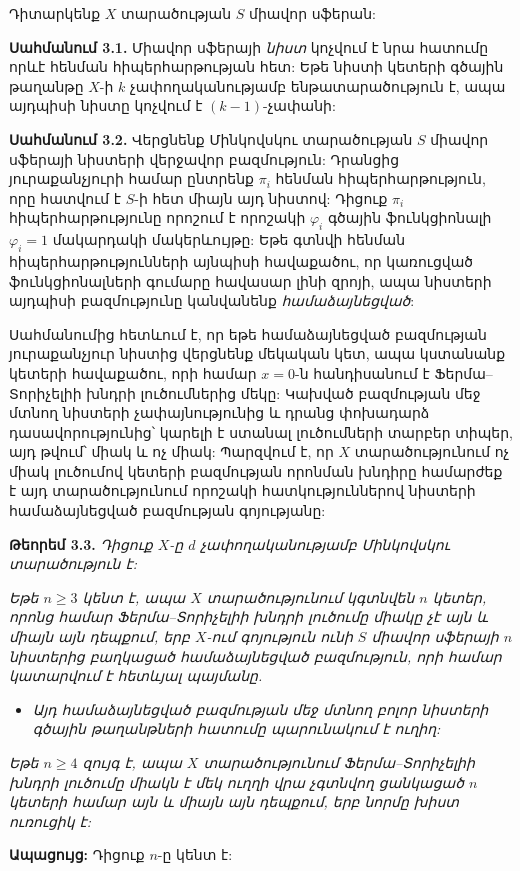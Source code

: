 \documentclass[12pt,a4paper]{article}
\numberwithin{equation}{section}
\numberwithin{figure}{section}
\begin{document}
Դիտարկենք $X$ տարածության $S$ միավոր սֆերան:

\textbf{Սահմանում 3.1.} Միավոր սֆերայի \textit{նիստ} կոչվում է նրա հատումը որևէ հենման հիպերհարթության հետ: Եթե նիստի կետերի գծային թաղանթը $X$-ի $k$ չափողականությամբ ենթատարածություն է, ապա այդպիսի նիստը կոչվում է $(k-1)$-չափանի:

\textbf{Սահմանում 3.2.} Վերցնենք Մինկովսկու տարածության $S$ միավոր սֆերայի նիստերի վերջավոր բազմություն: Դրանցից յուրաքանչյուրի համար ընտրենք $\pi_i$ հենման հիպերհարթություն, որը հատվում է $S$-ի հետ միայն այդ նիստով: Դիցուք $\pi_i$ հիպերհարթությունը որոշում է որոշակի $\varphi_i$ գծային ֆունկցիոնալի $\varphi_i = 1$ մակարդակի մակերևույթը: Եթե գտնվի հենման հիպերհարթությունների այնպիսի հավաքածու, որ կառուցված ֆունկցիոնալների գումարը հավասար լինի զրոյի, ապա նիստերի այդպիսի բազմությունը կանվանենք \textit{համաձայնեցված}:

Սահմանումից հետևում է, որ եթե համաձայնեցված բազմության յուրաքանչյուր նիստից վերցնենք մեկական կետ, ապա կստանանք կետերի հավաքածու, որի համար $x = 0$-ն հանդիսանում է Ֆերմա--Տորիչելիի խնդրի լուծումներից մեկը: Կախված բազմության մեջ մտնող նիստերի չափայնությունից և դրանց փոխադարձ դասավորությունից՝ կարելի է ստանալ լուծումների տարբեր տիպեր, այդ թվում՝ միակ և ոչ միակ: Պարզվում է, որ $X$ տարածությունում ոչ միակ լուծումով կետերի բազմության որոնման խնդիրը համարժեք է այդ տարածությունում որոշակի հատկություններով նիստերի համաձայնեցված բազմության գոյությանը:

\textbf{Թեորեմ 3.3.} \textit{Դիցուք $X$-ը $d$ չափողականությամբ Մինկովսկու տարածություն է:}

\textit{Եթե $n \ge 3$ կենտ է, ապա $X$ տարածությունում կգտնվեն $n$ կետեր, որոնց համար Ֆերմա--Տորիչելիի խնդրի լուծումը միակը չէ այն և միայն այն դեպքում, երբ $X$-ում գոյություն ունի $S$ միավոր սֆերայի $n$ նիստերից բաղկացած համաձայնեցված բազմություն, որի համար կատարվում է հետևյալ պայմանը.}
\begin{itemize}[label=\textbullet]
    \item \textit{Այդ համաձայնեցված բազմության մեջ մտնող բոլոր նիստերի գծային թաղանթների հատումը պարունակում է ուղիղ:}
\end{itemize}

\textit{Եթե $n \ge 4$ զույգ է, ապա $X$ տարածությունում Ֆերմա--Տորիչելիի խնդրի լուծումը միակն է մեկ ուղղի վրա չգտնվող ցանկացած $n$ կետերի համար այն և միայն այն դեպքում, երբ նորմը խիստ ուռուցիկ է:}

\textbf{Ապացույց:} Դիցուք $n$-ը կենտ է:
\end{document}
